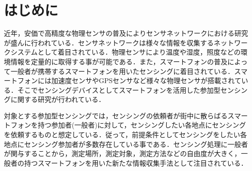 \documentclass[submit,techrep]{ipsj}
\begin{document}



%
%
%

\maketitle

\section{はじめに}


近年，安価で高精度な物理センサの普及によりセンサネットワークにおける研究が盛んに行われている．センサネットワークは様々な情報を収集するネットワークシステムとして着目されている\cite{Viani}．物理センサにより温度や湿度，照度などの環境情報を定量的に取得する事が可能である．また，スマートフォンの普及によって一般者が携帯するスマートフォンを用いたセンシングに着目されている．スマートフォンには加速度センサやGPSセンサなど様々な物理センサが搭載されている．そこでセンシングデバイスとしてスマートフォンを活用した参加型センシングに関する研究が行われている\cite{Nicholas}．

対象とする参加型センシングでは，センシングの依頼者が街中に散らばるスマートフォンを持つ参加者(一般者)に対して，センシングしたい各地点にセンシングを依頼するものと想定している\cite{Burke}．従って，前提条件としてセンシングをしたい各地点にセンシング参加者が多数存在している事である．センシング処理に一般者が関与することから，測定場所，測定対象，測定方法などの自由度が大きく，一般者の持つスマートフォンを用いた新たな情報収集手法として注目されている．
\end{document}
